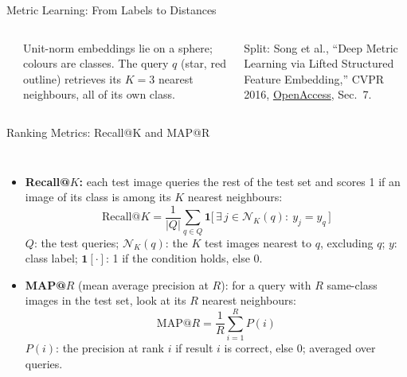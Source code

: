 \begin{frame}{Metric Learning: From Labels to Distances}
\begin{columns}[T,onlytextwidth]
\begin{tikzpicture}
      \end{tikzpicture}\\[0.3em]
      {\scriptsize Unit-norm embeddings lie on a sphere; colours are classes. The query $q$ (star, red outline) retrieves its $K=3$ nearest neighbours, all of its own class.\par}
      \vspace{0.5em}
      {\scriptsize Split: Song et al., ``Deep Metric Learning via Lifted Structured Feature Embedding,'' CVPR 2016, \href{https://openaccess.thecvf.com/content_cvpr_2016/papers/Song_Deep_Metric_Learning_CVPR_2016_paper.pdf}{OpenAccess}, Sec.~7.\par}
  \end{columns}
\end{frame}

\begin{frame}{Ranking Metrics: Recall@K and MAP@R}
  \begin{columns}[T,onlytextwidth]
      \begin{itemize}\footnotesize\itemsep0.35em
        \item \textbf{Recall@$K$:} each test image queries the rest of the test set and scores 1 if an image of its class is among its $K$ nearest neighbours:
        \[ \text{Recall@}K=\frac{1}{|Q|}\sum_{q\in Q}\mathbf{1}\big[\,\exists\, j\in\mathcal{N}_K(q):\ y_j=y_q\,\big] \]
        $Q$: the test queries; $\mathcal{N}_K(q)$: the $K$ test images nearest to $q$, excluding $q$; $y$: class label; $\mathbf{1}[\cdot]$: 1 if the condition holds, else 0.
        \item \textbf{MAP@$R$} (mean average precision at $R$): for a query with $R$ same-class images in the test set, look at its $R$ nearest neighbours:
        \[ \text{MAP@}R=\frac{1}{R}\sum_{i=1}^{R}P(i) \]
        $P(i)$: the precision at rank $i$ if result $i$ is correct, else 0; averaged over queries.
      \end{itemize}
      \centering
      \vspace{0.6em}
\end{columns}
\end{frame}
